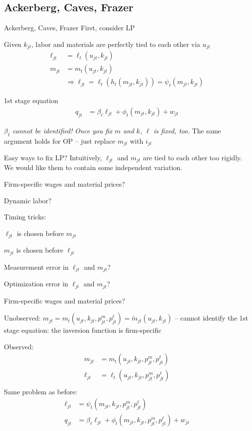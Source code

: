 \subsection{Ackerberg, Caves, Frazer}
\begin{frame}{Ackerberg, Caves, Frazer}
	First, consider LP
	\bi
		\item{Given $k_{jt}$, labor and materials are perfectly tied to each other via $u_{jt}$
		\begin{align*}
			\ell_{jt} &= \ell_t(u_{jt}, k_{jt})\\
			m_{jt} &= m_t(u_{jt}, k_{jt})\\
			&\Longrightarrow \ell_{jt} = \ell_t(h_t(m_{jt}, k_{jt})) = \psi_t(m_{jt}, k_{jt})
		\end{align*}}
		\item{1st stage equation
		\begin{align*}
			q_{jt} &= \beta_\ell\ell_{jt} + \phi_t(m_{jt}, k_{jt}) + w_{jt}
		\end{align*}}
		\item{\emph{$\beta_\ell$ cannot be identified! Once you fix $m$ and $k$, $\ell$ is fixed, too.}}
	\ei
	The same argument holds for OP -- just replace $m_{jt}$ with $i_{jt}$
\end{frame}

\begin{frame}{Easy ways to fix LP?}
	Intuitively, $\ell_{jt}$ and $m_{jt}$ are tied to each other too rigidly. We would like them to contain some independent variation.
	\bi
		\item{Firm-specific wages and material prices?}
		\item{Dynamic labor?}
		\item{Timing tricks:
		\bi
			\item{$\ell_{jt}$ is chosen before $m_{jt}$}
			\item{$m_{jt}$ is chosen before $\ell_{jt}$}
		\ei}
		\item{Measurement error in $\ell_{jt}$ and $m_{jt}$?}
		\item{Optimization error in $\ell_{jt}$ and $m_{jt}$?}
	\ei
\end{frame}

\begin{frame}{Firm-specific wages and material prices?}
	\bi
		\item{Unobserved: $m_{jt} = m_t(u_{jt}, k_{jt}, p^m_{jt}, p^\ell_{jt}) = \widetilde{m}_{jt}(u_{jt}, k_{jt})$ -- cannot identify the 1st stage equation: the inversion function is firm-specific}
		\item{Observed:
		\begin{align*}
			m_{jt} &= m_t(u_{jt}, k_{jt}, p^m_{jt}, p^\ell_{jt})\\
			\ell_{jt} &= \ell_t(u_{jt}, k_{jt}, p^m_{jt}, p^\ell_{jt})\\
		\end{align*}
		Same problem as before:
		\begin{align*}
			\ell_{jt} &= \psi_t(m_{jt}, k_{jt}, p^m_{jt}, p^\ell_{jt})\\
			q_{jt} &= \beta_\ell\ell_{jt} + \phi_t(m_{jt}, k_{jt}, p^m_{jt}, p^\ell_{jt}) + w_{jt}
		\end{align*}}
	\ei
\end{frame}

